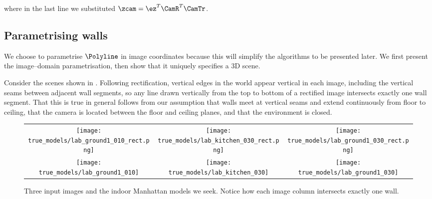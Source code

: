 where in the last line we substituted $\zcam =
\ez^T\CamR^T\CamTr$.

\subsection{Parametrising walls}

We choose to parametrise $\Polyline$ in image coordinates because this
will simplify the algorithms to be presented later. We first present
the image--domain parametrisation, then show that it uniquely
specifies a 3D scene.

Consider the scenes shown in . Following
rectification, vertical edges in the world appear vertical in each
image, including the vertical seams between adjacent wall segments, so
any line drawn vertically from the top to bottom of a rectified image
intersects exactly one wall segment. That this is true in general
follows from our assumption that walls meet at vertical seams and
extend continuously from floor to ceiling, that the camera is located
between the floor and ceiling planes, and that the environment is
closed.

\begin{figure}[tb]%
  \centering
    \begin{tabular}{ccc}
      \texttt{[image: true\_models/lab\_ground1\_010\_rect.png]} &
      \texttt{[image: true\_models/lab\_kitchen\_030\_rect.png]} &
      \texttt{[image: true\_models/lab\_ground1\_030\_rect.png]}
      \\      
      \texttt{[image: true\_models/lab\_ground1\_010]} &
      \texttt{[image: true\_models/lab\_kitchen\_030]} &
      \texttt{[image: true\_models/lab\_ground1\_030]}
    \end{tabular}
  \caption{Three input images and the indoor Manhattan models we
    seek. Notice how each image column intersects exactly one
    wall.}
  \label{fig:example-scenes}
\end{figure}

